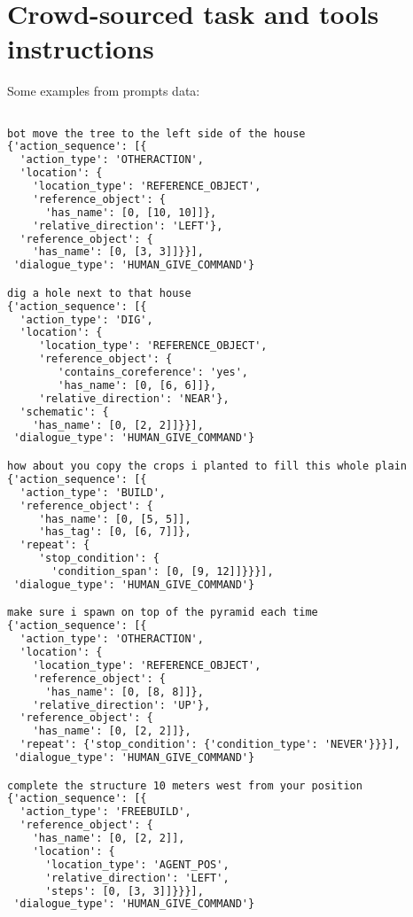 \clearpage

\lstset{
basicstyle=\small\ttfamily,
columns=flexible,
breaklines=true
}

\section{Crowd-sourced task and tools instructions}
\label{sec:dataset_examples}

Some examples from prompts data:

\begin{lstlisting}[language=TeX]

bot move the tree to the left side of the house
{'action_sequence': [{
  'action_type': 'OTHERACTION',
  'location': {
    'location_type': 'REFERENCE_OBJECT',
    'reference_object': {
      'has_name': [0, [10, 10]]},
    'relative_direction': 'LEFT'},
  'reference_object': {
    'has_name': [0, [3, 3]]}}],
 'dialogue_type': 'HUMAN_GIVE_COMMAND'}

dig a hole next to that house
{'action_sequence': [{
  'action_type': 'DIG',
  'location': {
     'location_type': 'REFERENCE_OBJECT',
     'reference_object': {
        'contains_coreference': 'yes',
        'has_name': [0, [6, 6]]},
     'relative_direction': 'NEAR'},
  'schematic': {
    'has_name': [0, [2, 2]]}}],
 'dialogue_type': 'HUMAN_GIVE_COMMAND'}

how about you copy the crops i planted to fill this whole plain
{'action_sequence': [{
  'action_type': 'BUILD',
  'reference_object': {
     'has_name': [0, [5, 5]],
     'has_tag': [0, [6, 7]]},
  'repeat': {
     'stop_condition': {
       'condition_span': [0, [9, 12]]}}}],
 'dialogue_type': 'HUMAN_GIVE_COMMAND'}

make sure i spawn on top of the pyramid each time
{'action_sequence': [{
  'action_type': 'OTHERACTION',
  'location': {
    'location_type': 'REFERENCE_OBJECT',
    'reference_object': {
      'has_name': [0, [8, 8]]},
    'relative_direction': 'UP'},
  'reference_object': {
    'has_name': [0, [2, 2]]},
  'repeat': {'stop_condition': {'condition_type': 'NEVER'}}}],
 'dialogue_type': 'HUMAN_GIVE_COMMAND'}

complete the structure 10 meters west from your position
{'action_sequence': [{
  'action_type': 'FREEBUILD',
  'reference_object': {
    'has_name': [0, [2, 2]],
    'location': {
      'location_type': 'AGENT_POS',
      'relative_direction': 'LEFT',
      'steps': [0, [3, 3]]}}}],
 'dialogue_type': 'HUMAN_GIVE_COMMAND'}


\end{lstlisting}
